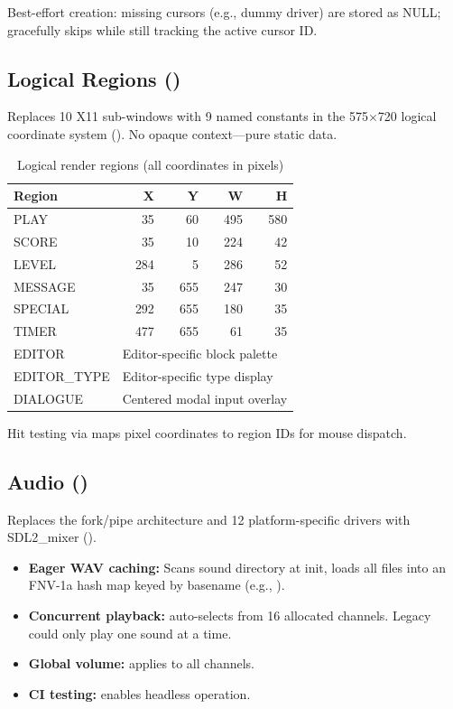 \documentclass[11pt,a4paper]{article}
\begin{document}
Best-effort creation: missing cursors (e.g., dummy driver) are stored as NULL;  gracefully skips  while still tracking the active cursor ID.

\subsection{Logical Regions ()}
\label{sec:regions}

Replaces 10 X11 sub-windows with 9 named  constants in the 575$\times$720 logical coordinate system (). No opaque context---pure static data.

\begin{table}[h]
\centering
\caption{Logical render regions (all coordinates in pixels)}
\label{tab:regions}
\begin{tabular}{lrrrr}
\toprule
\textbf{Region} & \textbf{X} & \textbf{Y} & \textbf{W} & \textbf{H} \\
\midrule
PLAY & 35 & 60 & 495 & 580 \\
SCORE & 35 & 10 & 224 & 42 \\
LEVEL & 284 & 5 & 286 & 52 \\
MESSAGE & 35 & 655 & 247 & 30 \\
SPECIAL & 292 & 655 & 180 & 35 \\
TIMER & 477 & 655 & 61 & 35 \\
EDITOR & \multicolumn{4}{l}{Editor-specific block palette} \\
EDITOR\_TYPE & \multicolumn{4}{l}{Editor-specific type display} \\
DIALOGUE & \multicolumn{4}{l}{Centered modal input overlay} \\
\bottomrule
\end{tabular}
\end{table}

Hit testing via  maps pixel coordinates to region IDs for mouse dispatch.

\subsection{Audio ()}
\label{sec:audio}

Replaces the fork/pipe architecture and 12 platform-specific drivers with SDL2\_mixer ().

\begin{itemize}[nosep]
    \item \textbf{Eager WAV caching:} Scans sound directory at init, loads all  files into an FNV-1a hash map keyed by basename (e.g., ).
    \item \textbf{Concurrent playback:}  auto-selects from 16 allocated channels. Legacy could only play one sound at a time.
    \item \textbf{Global volume:}  applies to all channels.
    \item \textbf{CI testing:}  enables headless operation.
\end{itemize}
\end{document}
